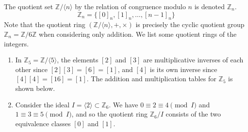   \begin{example}
    The quotient set $\mathbb{Z}/\langle n \rangle$ by the relation of congruence modulo $n$ is denoted $\mathbb{Z}_{n}$. 
    \begin{equation}
      \mathbb{Z}_{n} = \{ [0]_{n}, [1]_{n}, \ldots, [n-1]_{n} \}
    \end{equation}
    Note that the quotient ring $(\mathbb{Z}/\langle n \rangle, +, \times)$ is precisely the cyclic quotient group $\mathbb{Z}_n = \mathbb{Z}/6\mathbb{Z}$ when considering only addition. We list some quotient rings of the integers. 
    \begin{enumerate}
      \item In $\mathbb{Z}_{5} = \mathbb{Z}/\langle 5 \rangle$, the elements $[2]$ and $[3]$ are multiplicative inverses of each other since $[2] [3] = [6] = [1]$, and $[4]$ is its own inverse since $[4] [4] = [16] = [1]$. The addition and multiplication tables for $\mathbb{Z}_5$ is shown below. 
      \item Consider the ideal $I = \langle 2 \rangle \subset \mathbb{Z}_6$. We have $0 \equiv 2 \equiv 4 \pmod{I}$ and $1 \equiv 3 \equiv 5 \pmod{I}$, and so the quotient ring $\mathbb{Z}_6 / I$ consists of the two equivalence classes $[0]$ and $[1]$. 
    \end{enumerate}
  \end{example}

